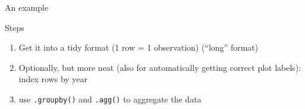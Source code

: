 \documentclass[handout]{beamer}
\begin{document}
\begin{frame}[plain]
An example
\end{frame}


{
	\begin{frame}[plain]
\end{frame}
}

\begin{frame}{Steps}
\begin{enumerate}
	\item Get it into a tidy format (1 row = 1 observation) (``long'' format)
	\item Optionally, but more neat (also for automatically getting correct plot labels): \\ index rows by year
	\item use \texttt{.groupby()} and \texttt{.agg()} to aggregate the data
\end{enumerate}
\end{frame}


{
	\begin{frame}[plain]
\end{frame}
}
\end{document}
